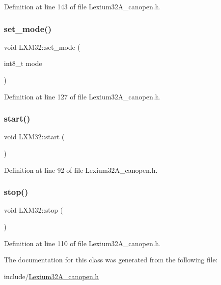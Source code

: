 Definition at line 143 of file Lexium32\+A\+\_\+canopen.\+h.

\mbox{\label{class_l_x_m32_a4087402e009dd3be18765caac410d412}} 
\subsubsection{\texorpdfstring{set\+\_\+mode()}{set\_mode()}}
{\footnotesize\ttfamily void L\+X\+M32\+::set\+\_\+mode (\begin{DoxyParamCaption}\item[{int8\+\_\+t}]{mode }\end{DoxyParamCaption})\hspace{0.3cm}{\ttfamily [inline]}}



Definition at line 127 of file Lexium32\+A\+\_\+canopen.\+h.

\mbox{\label{class_l_x_m32_a53198cf491d6b00d698bac5a55bbe5d4}} 
\subsubsection{\texorpdfstring{start()}{start()}}
{\footnotesize\ttfamily void L\+X\+M32\+::start (\begin{DoxyParamCaption}{ }\end{DoxyParamCaption})\hspace{0.3cm}{\ttfamily [inline]}}



Definition at line 92 of file Lexium32\+A\+\_\+canopen.\+h.

\mbox{\label{class_l_x_m32_a73364111a5c2be2d60b7456704f7b9a8}} 
\subsubsection{\texorpdfstring{stop()}{stop()}}
{\footnotesize\ttfamily void L\+X\+M32\+::stop (\begin{DoxyParamCaption}{ }\end{DoxyParamCaption})\hspace{0.3cm}{\ttfamily [inline]}}



Definition at line 110 of file Lexium32\+A\+\_\+canopen.\+h.



The documentation for this class was generated from the following file\+:\begin{DoxyCompactItemize}
\item 
include/\hyperlink{_lexium32_a__canopen_8h}{Lexium32\+A\+\_\+canopen.\+h}\end{DoxyCompactItemize}
